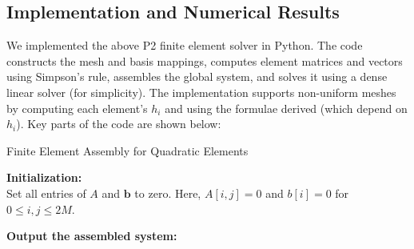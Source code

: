 \documentclass[a4paper,10pt]{article}
\begin{document}
\subsection{Implementation and Numerical Results}

We implemented the above P2 finite element solver in Python.
The code constructs the mesh and basis mappings, computes element matrices and vectors using Simpson's rule, assembles the global system, and solves it using a dense linear solver (for simplicity).
The implementation supports non-uniform meshes by computing each element’s $h_i$ and using the formulae derived (which depend on $h_i$).
Key parts of the code are shown below:


\begin{algorithm}[H]
	\caption{Finite Element Assembly for Quadratic Elements}
	\label{alg:FEM_assembly}


	\BlankLine

	\textbf{Initialization:}\\
	Set all entries of $A$ and $\mathbf{b}$ to zero.
	Here, $A[i,j] = 0$ and $b[i] = 0$ for $0 \le i,j \le 2M$.\;

	\BlankLine
	\BlankLine

	\textbf{Output the assembled system:}\\

\end{algorithm}
\end{document}
